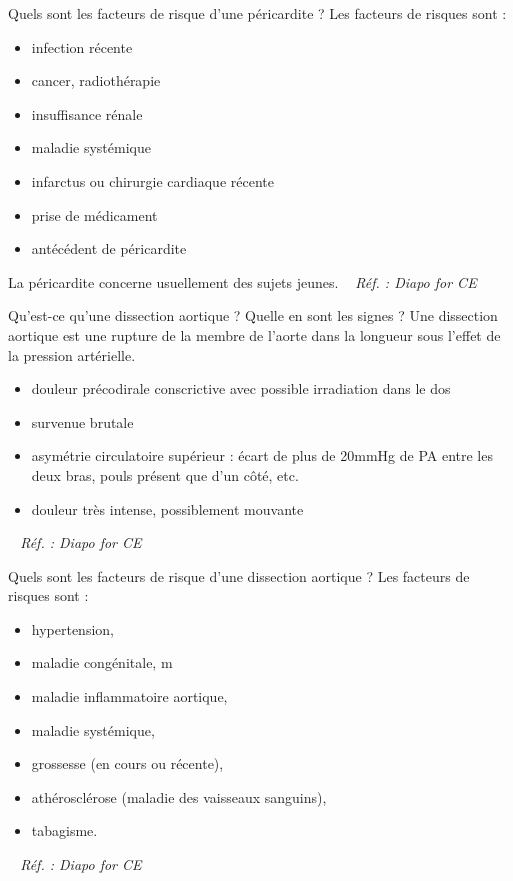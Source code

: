 \documentclass[grid,avery5371,landscape]{flashcards}
\makeatletter
\newcounter{nocarte}
\newcommand{\categ}[1]{%
  \def\@categ{#1}%
  \setcounter{nocarte}{0}%
}
\newcommand{\source}[1]{%
  \medskip
  \itshape%
   ~ \hfill Réf. : #1}
\makeatother
\begin{document}
\color[HTML]{01DF01}
\categ{CE-CP-REG}
\begin{flashcard}[bilan]{
 Quels sont les facteurs de risque d'une péricardite ?   }
  Les facteurs de risques sont :
   \begin{itemize}
       \item infection récente
       \item cancer, radiothérapie
       \item insuffisance rénale
       \item maladie systémique
       \item infarctus ou chirurgie cardiaque récente
       \item prise de médicament
       \item antécédent de péricardite
   \end{itemize}
   La péricardite concerne usuellement des sujets jeunes.
  \source{Diapo for CE }
\end{flashcard}


\color[HTML]{01DF01}
\categ{CE-CP-REG}
\begin{flashcard}[bilan]{
 Qu'est-ce qu'une dissection aortique ? Quelle en sont les signes ?   }
  Une dissection aortique est une rupture de la membre de l'aorte dans la longueur sous l'effet de la pression artérielle.
   \begin{itemize}
       \item douleur précodirale conscrictive avec possible irradiation dans le dos
       \item survenue brutale
       \item asymétrie circulatoire supérieur : écart de plus de 20mmHg de PA entre les deux bras, pouls présent que d'un côté, etc.
       \item douleur très intense, possiblement mouvante
   \end{itemize}
  \source{Diapo for CE }
\end{flashcard}


\color[HTML]{01DF01}
\categ{CE-CP-REG}
\begin{flashcard}[bilan]{
 Quels sont les facteurs de risque d'une dissection aortique  ?   }
  Les facteurs de risques sont :
   \begin{itemize}
       \item hypertension, 
       \item maladie congénitale, m
       \item maladie inflammatoire aortique, 
       \item maladie systémique, 
       \item grossesse (en cours ou récente), 
       \item athérosclérose (maladie des vaisseaux sanguins),
       \item tabagisme.
   \end{itemize}
  \source{Diapo for CE }
\end{flashcard}
\end{document}
